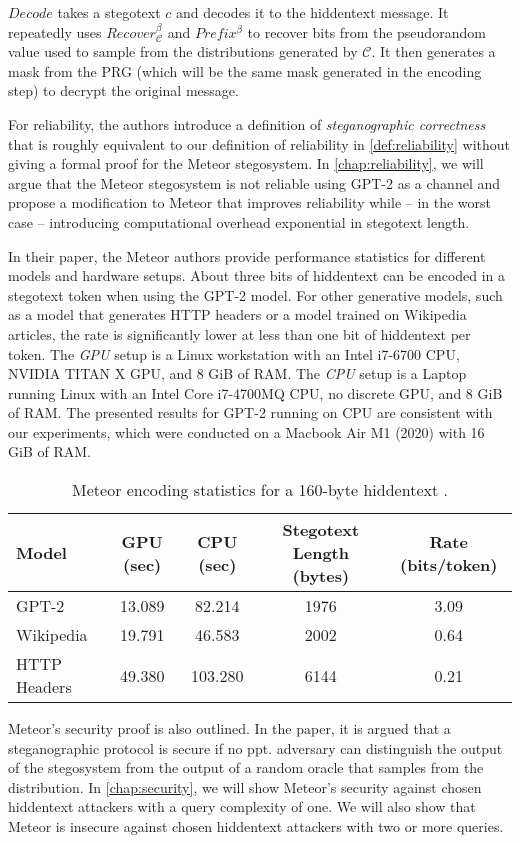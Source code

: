 $Decode$ takes a stegotext $c$ and decodes it to the hiddentext message.
It repeatedly uses $Recover_{\mathcal{C}}^\beta$ and $Prefix^\beta$ to recover bits from the pseudorandom value used to sample from the distributions generated by $\mathcal{C}$.
It then generates a mask from the PRG (which will be the same mask generated in the encoding step) to decrypt the original message.

For reliability, the authors introduce a definition of \emph{steganographic correctness} that is roughly equivalent to our definition of reliability in \autoref{def:reliability} without giving a formal proof for the Meteor stegosystem.
In \autoref{chap:reliability}, we will argue that the Meteor stegosystem is not reliable using GPT-2 as a channel and propose a modification to Meteor that improves reliability while -- in the worst case -- introducing computational overhead exponential in stegotext length.

In their paper, the Meteor authors provide performance statistics for different models and hardware setups.
About three bits of hiddentext can be encoded in a stegotext token when using the GPT-2 model.
For other generative models, such as a model that generates HTTP headers or a model trained on Wikipedia articles, the rate is significantly lower at less than one bit of hiddentext per token.
The \emph{GPU} setup is a Linux workstation with an Intel i7-6700 CPU, NVIDIA TITAN X GPU, and 8 GiB of RAM.
The \emph{CPU} setup is a Laptop running Linux with an Intel Core i7-4700MQ CPU, no discrete GPU, and 8 GiB of RAM.
The presented results for GPT-2 running on CPU are consistent with our experiments, which were conducted on a Macbook Air M1 (2020) with 16 GiB of RAM.

\begin{table}[h!]
  \begin{tabular}{l||c|c|c|c}
    Model & GPU (sec) & CPU (sec) & Stegotext Length (bytes) & Rate (bits/token) \\
    \hline
    GPT-2        & 13.089 & 82.214  & 1976 & 3.09 \\
    Wikipedia    & 19.791 & 46.583  & 2002 & 0.64 \\
    HTTP Headers & 49.380 & 103.280 & 6144 & 0.21 \\
  \end{tabular}
  \caption{Meteor encoding statistics for a 160-byte hiddentext \cite{Meteor2021}.}
\end{table}

Meteor's security proof is also outlined.
In the paper, it is argued that a steganographic protocol is secure if no ppt. adversary can distinguish the output of the stegosystem from the output of a random oracle that samples from the distribution.
In \autoref{chap:security}, we will show Meteor's security against chosen hiddentext attackers with a query complexity of one.
We will also show that Meteor is insecure against chosen hiddentext attackers with two or more queries.
